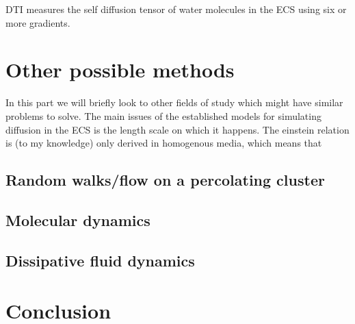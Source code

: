 \documentclass[a4paper,english, 12pt, twoside]{article}
\begin{document}
DTI measures the self diffusion tensor of water molecules in the ECS using six or more gradients. 

\section{Other possible methods}
In this part we will briefly look to other fields of study which might have similar problems to solve. 
The main issues of the established models for simulating diffusion in the ECS is the length scale on which it happens. 
The einstein relation is (to my knowledge) only derived in homogenous media, which means that 
\subsection{Random walks/flow on a percolating cluster}

\subsection{Molecular dynamics}

\subsection{Dissipative fluid dynamics}

\section{Conclusion}
%   

\printbibliography
\end{document}
